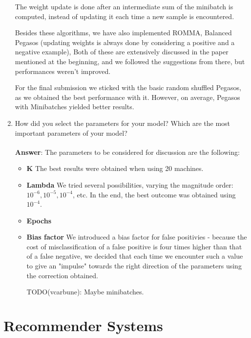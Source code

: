 \documentclass[11pt]{article}
\begin{document}
\begin{enumerate}
The weight update is done after an intermediate sum of the minibatch is
computed, instead of updating it each time a new sample is encountered.

Besides these algorithms, we have also implemented ROMMA, Balanced
Pegasos (updating weights is always done by considering a positive and a
negative example), Both of these are extensively discussed in the paper
mentioned at the beginning, and we followed the suggestions from there,
but performances weren't improved.

For the final submission we sticked with the basic random shuffled
Pegasos, as we obtained the best performance with it. However, on
average, Pegasos with Minibatches yielded better results.

\item How did you select the parameters for your model? Which are the
  most important parameters of your model? \\ \\
\textbf{Answer}:  The parameters to be considered for discussion are the following:
\begin{itemize}
\item{\textbf{K}} The best results were obtained when using 20 machines.
\item{\textbf{Lambda}} We tried several possibilities, varying the
magnitude order: $10^{-6}, 10^{-5}, 10^{-4}$, etc. In the end, the best
outcome was obtained using $10^{-4}$.
\item{\textbf{Epochs}}
\item{\textbf{Bias factor}} We introduced a bias factor for false
positivies - because the cost of misclassification of a false positive is
four times higher than that of a false negative, we decided that each
time we encounter such a value to give an "impulse" towards the right
direction of the parameters using the correction obtained.

TODO(vcarbune): Maybe minibatches.

\end{itemize}

\end{enumerate}

\section{Recommender Systems}
\end{document}
